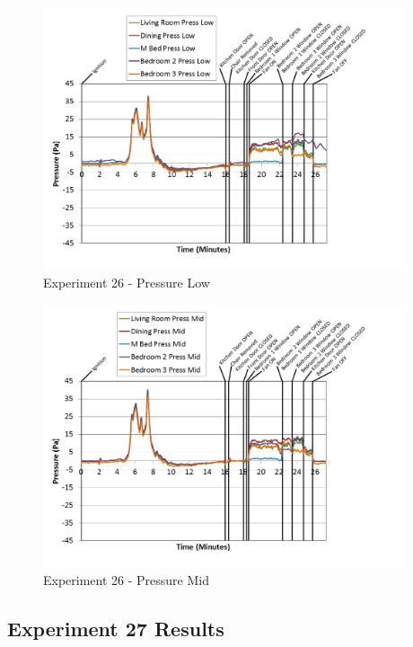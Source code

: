 \documentclass{article}
\begin{document}
\begin{appendices}
\clearpage

\begin{figure}[h!]
	\centering
	\includegraphics[height=3.05in]{0_Images/Results_Charts/Exp_26_Charts/PressureLow.png}
	\caption{Experiment 26 - Pressure Low}
\end{figure}


\begin{figure}[h!]
	\centering
	\includegraphics[height=3.05in]{0_Images/Results_Charts/Exp_26_Charts/PressureMid.png}
	\caption{Experiment 26 - Pressure Mid}
\end{figure}

\clearpage

\clearpage
\clearpage		\large
\subsection{Experiment 27 Results} \label{App:Exp27Results} 


\end{appendices}
\end{document}
